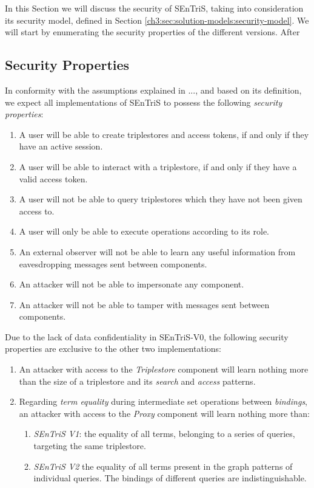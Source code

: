 In this Section we will discuss the security of \gls{SEnTriS}, taking into consideration its security model, defined in Section \ref{ch3:sec:solution-models:security-model}. We will start by enumerating the security properties of the different versions. After

\subsection{Security Properties}
In conformity with the assumptions explained in ..., and based on its definition, we expect all implementations of \gls{SEnTriS} to possess the following \emph{security properties}:

\begin{enumerate}
    \item A user will be able to create triplestores and access tokens, if and only if they have an active session.
    \item A user will be able to interact with a triplestore, if and only if they have a valid access token.
    \item A user will not be able to query triplestores which they have not been given access to.
    \item A user will only be able to execute operations according to its role.
    \item An external observer will not be able to learn any useful information from eavesdropping messages sent between components.
    \item An attacker will not be able to impersonate any component.
    \item An attacker will not be able to tamper with messages sent between components.
\end{enumerate}

Due to the lack of data confidentiality in \gls{SEnTriS}-V0, the following security properties are exclusive to the other two implementations:
\begin{enumerate}
    \item An attacker with access to the \emph{Triplestore} component will learn nothing more than the size of a triplestore and its \emph{search} and \emph{access} patterns.
    \item Regarding \emph{term equality} during intermediate set operations between \emph{bindings}, an attacker with access to the \emph{Proxy} component will learn nothing more than:
        \begin{enumerate}
            \item \emph{SEnTriS V1}: the equality of all terms, belonging to a series of queries, targeting the same triplestore.
            \item \emph{SEnTriS V2} the equality of all terms present in the graph patterns of individual queries. The bindings of different queries are indistinguishable.
        \end{enumerate}
\end{enumerate}

